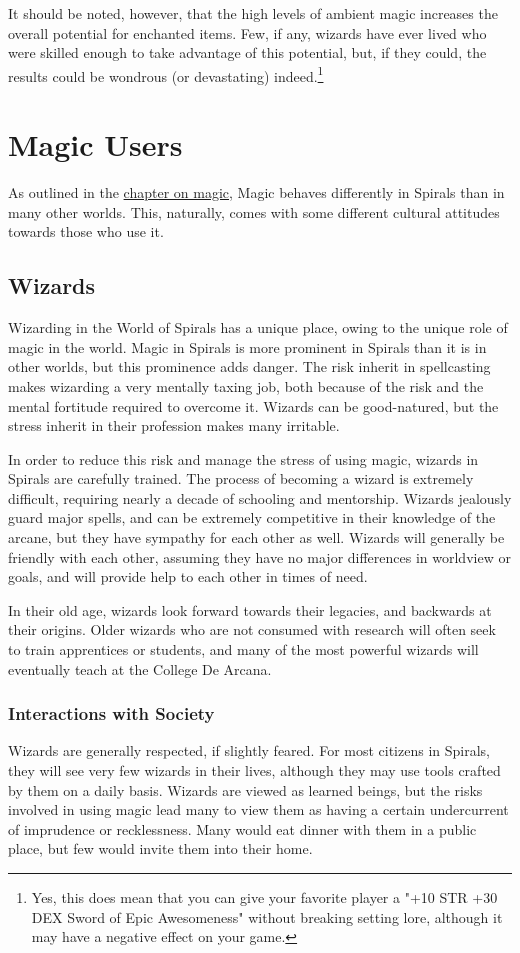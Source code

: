 \begin{multicols}{2}
It should be noted, however, that the high levels of ambient magic increases the overall potential for enchanted items.
Few, if any, wizards have ever lived who were skilled enough to take advantage of this potential, but, if they could, the results could be wondrous (or devastating) indeed.\footnote{Yes, this does mean that you can give your favorite player a "+10 STR +30 DEX Sword of Epic Awesomeness" without breaking setting lore, although it may have a negative effect on your game.}

\section{Magic Users}
As outlined in the \hyperref[chapter:magic]{chapter on magic}, Magic behaves differently in Spirals than in many other worlds.
This, naturally, comes with some different cultural attitudes towards those who use it.

\subsection{Wizards}
Wizarding in the World of Spirals has a unique place, owing to the unique role of magic in the world.
Magic in Spirals is more prominent in Spirals than it is in other worlds, but this prominence adds danger.
The risk inherit in spellcasting makes wizarding a very mentally taxing job, both because of the risk and the mental fortitude required to overcome it.
Wizards can be good-natured, but the stress inherit in their profession makes many irritable. 

In order to reduce this risk and manage the stress of using magic, wizards in Spirals are carefully trained.
The process of becoming a wizard is extremely difficult, requiring nearly a decade of schooling and mentorship.
Wizards jealously guard major spells, and can be extremely competitive in their knowledge of the arcane, but they have sympathy for each other as well.
Wizards will generally be friendly with each other, assuming they have no major differences in worldview or goals, and will provide help to each other in times of need.

In their old age, wizards look forward towards their legacies, and backwards at their origins.
Older wizards who are not consumed with research will often seek to train apprentices or students, and many of the most powerful wizards will eventually teach at the College De Arcana.

\subsubsection{Interactions with Society}
Wizards are generally respected, if slightly feared.
For most citizens in Spirals, they will see very few wizards in their lives, although they may use tools crafted by them on a daily basis.
Wizards are viewed as learned beings, but the risks involved in using magic lead many to view them as having a certain undercurrent of imprudence or recklessness.
Many would eat dinner with them in a public place, but few would invite them into their home.


\end{multicols}
